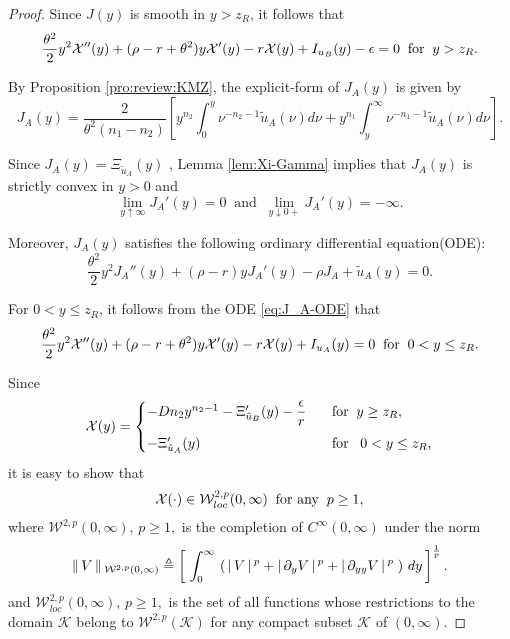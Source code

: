 \documentclass[a4paper,report, 11pt]{article}
\def\e{\epsilon}
\def\t{\theta}
\begin{document}
\begin{proof}
	Since $J(y)$ is smooth in $y>z_R$, it follows that 
	$$
	\dfrac{\theta^2}{2}y^2{\cal X}''(y) + (\rho-r+\theta^2)y{\cal X}'(y) - r{\cal X}(y)+I_{u_B}(y)-\e=0\;\;\mbox{for}\;\;y>z_R.
	$$
	
	By Proposition \ref{pro:review:KMZ}, the explicit-form of $J_A(y)$ is given by 
	\begin{equation*}
	J_A(y)=\dfrac{2}{\t^2(n_1-n_2)}\left[y^{n_2}\int_0^y \nu^{-n_2-1}\tilde{u}_A(\nu)d\nu +y^{n_1}\int_y^\infty \nu^{-n_1-1}\tilde{u}_A(\nu)d\nu\right].
	\end{equation*}
	
	Since $J_A(y)=\Xi_{\tilde{u}_A}(y)$ , Lemma \ref{lem:Xi-Gamma} implies that $J_A(y)$ is strictly convex in $y>0$ and 
	$$
	\lim_{y\uparrow \infty}J_A'(y)=0\;\;\mbox{and}\;\;\lim_{y\downarrow 0+}J_A'(y)=-\infty.
	$$
	
	Moreover, $J_A(y)$ satisfies the following ordinary differential equation(ODE):
	\begin{equation}\label{eq:J_A-ODE}
	\dfrac{\t^2}{2}y^2 J_A''(y)+(\rho-r)yJ_A'(y)-\rho J_A + \tilde{u}_A(y)=0. 
	\end{equation}
	
	For $0<y\le z_R$,  it follows from the ODE \eqref{eq:J_A-ODE} that 
	$$
	\dfrac{\theta^2}{2}y^2{\cal X}''(y) + (\rho-r+\theta^2)y{\cal X}'(y) - r{\cal X}(y)+I_{u_A}(y)=0\;\;\mbox{for}\;\;0<y\le z_R.
	$$
	
	Since 
	\begin{eqnarray}
	\begin{split}\label{eq:X}
	{\cal X}(y)=
	\begin{cases}
	-Dn_2y^{n_2-1}-\Xi_{\tilde{u}_B}'(y)-\dfrac{\e}{r}\;\;\;&\mbox{for}\;\;y\ge z_R,\vspace{2mm}\\
	-\Xi_{\tilde{u}_A}'(y)\;\;\;&\mbox{for}\;\;\;0<y\le z_R,
	\end{cases}
	\end{split}
	\end{eqnarray}
	it is easy to show that 
	\begin{equation*}
	{\cal X}(\cdot)\in {\cal W}_{loc}^{2,p}(0,\infty)\;\;\mbox{for any}\;\;p\ge 1,
	\end{equation*}
	where $\mathcal{W}^{2,p}(0,\infty),\,p\geq1,$ is the
	completion of $C^\infty(0,\infty)$ under the norm 
	$$
	\|\,V\,\|\,_{\mathcal{W}^{2,p}(0,\infty)}\triangleq \left[\;\int_{0}^{\infty}\,
	\left(\,|\,V\,|\,^p+|\,\partial_y V\,|\,^p
	+|\,\partial_{yy} V\,|\,^p\;\right)\,dy\,\right]^{1\over p}.
	$$
	and $\mathcal{W}^{2,p}_{{loc}}(0,\infty),\,p\geq1,$ is
	the set of all functions whose restrictions to the domain $\mathcal{K}$ belong to $\mathcal{W}^{2,p}(\mathcal{K})$ for any
	compact subset $\mathcal{K}$ of $(0,\infty)$.
	

\end{proof}
\end{document}

